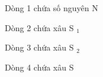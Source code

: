 Dòng 1 chứa số nguyên N  

   Dòng 2 chứa xâu S   $_    1   $

   Dòng 3 chứa xâu S   $_    2   $

   Dòng 4 chứa xâu S